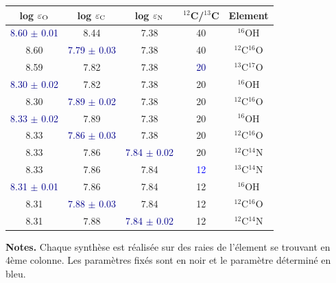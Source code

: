 \documentclass{article}
\begin{document}
\begin{table}[h!]
  \vspace{0.3cm}
\begin{center}
	\begin{tabular}{ccccc}
        \hline
		\hline
        log $\varepsilon_{\rm O}$ & log $\varepsilon_{\rm C}$ & log $\varepsilon_{\rm N}$ & $^{12}$C/$^{13}$C & Element\\
        \hline
    \textcolor{darkblue}{8.60 $\pm$ 0.01} & 8.44 & 7.38 & 40 & $^{16}$OH \\
    8.60 & \textcolor{darkblue}{7.79 $\pm$ 0.03} & 7.38 & 40 & $^{12}$C$^{16}$O \\
    8.59 & 7.82 & 7.38 & \textcolor{darkblue}{20} & $^{13}$C$^{17}$O \\
    \textcolor{darkblue}{8.30 $\pm$ 0.02} & 7.82 & 7.38 & 20 & $^{16}$OH \\
    8.30 & \textcolor{darkblue}{7.89 $\pm$ 0.02} & 7.38 & 20 & $^{12}$C$^{16}$O \\
    \textcolor{darkblue}{8.33 $\pm$ 0.02} & 7.89 & 7.38 & 20 & $^{16}$OH \\
    8.33 & \textcolor{darkblue}{7.86 $\pm$ 0.03} & 7.38 & 20 & $^{12}$C$^{16}$O \\
    8.33 & 7.86 & \textcolor{darkblue}{7.84 $\pm$ 0.02} & 20 & $^{12}$C$^{14}$N \\
    8.33 & 7.86 & 7.84 & \textcolor{blue}{12} & $^{13}$C$^{14}$N \\
    \textcolor{darkblue}{8.31 $\pm$ 0.01} & 7.86 & 7.84 & 12 & $^{16}$OH \\
    8.31 & \textcolor{darkblue}{7.88 $\pm$ 0.03} & 7.84 & 12 & $^{12}$C$^{16}$O \\
    8.31 & 7.88 & \textcolor{darkblue}{7.84 $\pm$ 0.02} & 12 & $^{12}$C$^{14}$N \\
    \end{tabular}
\end{center} 
\textbf{Notes.} 
Chaque synthèse est réalisée sur des raies de l'élement se trouvant en 4ème colonne. 
Les paramètres fixés sont en noir et le paramètre déterminé en bleu. 
\label{itération_CNO}
\end{table}
\end{document}
